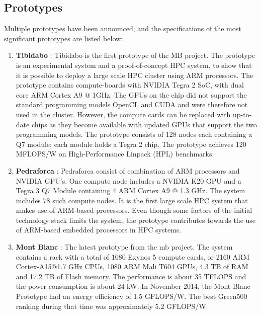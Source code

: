 \subsection{Prototypes}
Multiple prototypes have been announced, and the specifications of the most significant prototypes are listed below:
\begin{enumerate}
\item \textbf{Tibidabo} \cite{a:MB:Tib}: Tibidabo is the first prototype of the MB project. The prototype is an experimental system and a proof-of-concept HPC system, to show that it is possible to deploy a large scale HPC cluster using ARM processors. The prototype contains compute-boards with NVIDIA Tegra 2 SoC, with dual core ARM Cortex A9 @ 1GHz. The GPUs on the chip did not support the standard programming models OpenCL and CUDA and were therefore not used in the cluster. However, the compute cards can be replaced with up-to-date chips as they become available with updated GPUs that support the two programming models. The prototype consists of 128 nodes each containing a Q7 module; each module holds a Tegra 2 chip. The prototype achieves 120 MFLOPS/W on High-Performance Linpack (HPL) benchmarks.
\item \textbf{Pedraforca} \cite{p:MB:Pedr}: Pedraforca consist of combination of ARM processors and NVIDIA GPU’s. One compute node includes a NVIDIA K20 GPU and a Tegra 3 Q7 Module containing 4 ARM Cortex A9 @ 1.3 GHz. The system includes 78 such compute nodes. It is the first large scale HPC system that makes use of ARM-based processors. Even though some factors of the initial technology stack limits the system, the prototype contributes towards the use of ARM-based embedded processors in HPC systems.
\item \textbf{Mont Blanc} \cite{p:MB:MB-prot, p:MB-15}: The latest prototype from the \gls{mb} project. The system contains a rack with a total of 1080 Exynos 5 compute cards, or 2160 ARM Cortex-A15@1.7 GHz CPUs, 1080 ARM Mali T604 GPUs, 4.3 TB of RAM and 17.2 TB of Flash memory. The performance is about 35 TFLOPS and the power consumption is about 24 kW. In November 2014, the Mont Blanc Prototype had an energy efficiency of 1.5 GFLOPS/W. The best Green500 ranking during that time was approximately 5.2 GFLOPS/W.
\end{enumerate}



